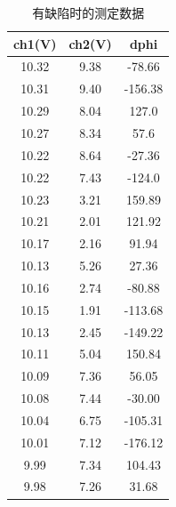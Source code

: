 \documentclass[fleqn,10pt]{SelfArx} %
\begin{document}
\begin{table}[h]
	\centering
	\begin{tabular}{|c|c|c|}
	\hline
	ch1(V)& ch2(V)  & dphi    \\ \hline
	10.32 & 9.38 & -78.66  \\ \hline
	10.31 & 9.40 & -156.38 \\ \hline
	10.29 & 8.04 & 127.0   \\ \hline
	10.27 & 8.34 & 57.6    \\ \hline
	10.22 & 8.64 & -27.36  \\ \hline
	10.22 & 7.43 & -124.0  \\ \hline
	10.23 & 3.21 & 159.89  \\ \hline
	10.21 & 2.01 & 121.92  \\ \hline
	10.17 & 2.16 & 91.94   \\ \hline
	10.13 & 5.26 & 27.36   \\ \hline
	10.16 & 2.74 & -80.88  \\ \hline
	10.15 & 1.91 & -113.68 \\ \hline
	10.13 & 2.45 & -149.22 \\ \hline
	10.11 & 5.04 & 150.84  \\ \hline
	10.09 & 7.36 & 56.05   \\ \hline
	10.08 & 7.44 & -30.00  \\ \hline
	10.04 & 6.75 & -105.31 \\ \hline
	10.01 & 7.12 & -176.12 \\ \hline
	9.99  & 7.34 & 104.43  \\ \hline
	9.98  & 7.26 & 31.68   \\ \hline
	\end{tabular}
	\caption{有缺陷时的测定数据}
	\label{tab:app4}
\end{table}
\end{document}
